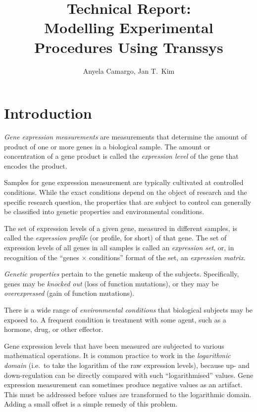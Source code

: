 \documentclass[a4paper,fleqn]{article}
\newcommand{\newterm}[1]{\emph{#1}}
\begin{document}
\title{Technical Report: \\
  Modelling Experimental Procedures Using Transsys}
\author{Anyela Camargo, Jan T.\ Kim}
\maketitle

\section{Introduction}

\newterm{Gene expression measurements} are measurements that determine
the amount of product of one or more genes in a biological sample. The
amount or concentration of a gene product is called the
\newterm{expression level} of the gene that encodes the product.

Samples for gene expression measurement are typically cultivated at
controlled conditions. While the exact conditions depend on the object
of research and the specific research question, the properties that
are subject to control can generally be classified into genetic
properties and environmental conditions.

The set of expression levels of a given gene, measured in different
samples, is called the \newterm{expression profile} (or profile, for
short) of that gene. The set of expression levels of all genes in all
samples is called an \newterm{expression set}, or, in recognition of
the ``genes $\times$ conditions'' format of the set, an
\newterm{expression matrix}.

\newterm{Genetic properties} pertain to the genetic makeup of the
subjects.  Specifically, genes may be \newterm{knocked out} (loss of
function mutations), or they may be \newterm{overexpressed} (gain of
function mutations).

There is a wide range of \newterm{environmental conditions} that
biological subjects may be exposed to. A frequent condition is
treatment with some agent, such as a hormone, drug, or other effector.

Gene expression levels that have been measured are subjected to
various mathematical operations. It is common practice to work in the
\newterm{logarithmic domain} (i.e.\ to take the logarithm of the raw
expression levels), because up- and down-regulation can be directly
compared with such ``logarithmised'' values. Gene expression
measurement can sometimes produce negative values as an artifact. This
must be addressed before values are transformed to the logarithmic
domain. Adding a small offset is a simple remedy of this problem.
\end{document}
